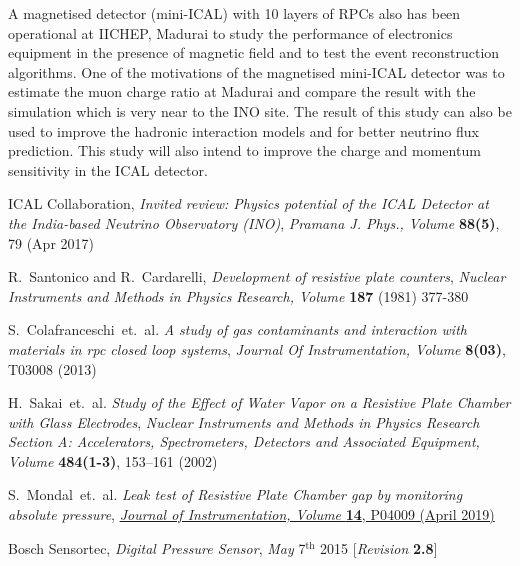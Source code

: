 \documentclass[a4paper,12pt,twoside,openany]{article}
\begin{document}
A magnetised detector (mini-ICAL) with 10 layers of RPCs also has been operational at IICHEP, Madurai to study the performance of electronics equipment in the presence of magnetic field and to test the event reconstruction algorithms. One of the motivations of the magnetised mini-ICAL detector was to estimate the muon charge ratio at Madurai and compare the result with the simulation which is very near to the INO site. The result of this study can also be used to improve the hadronic interaction models and for better neutrino flux prediction. This study will also intend to improve the charge and momentum sensitivity in the ICAL detector.


\begin{thebibliography}{9}

  ICAL Collaboration,  \emph{Invited review: Physics potential of the ICAL Detector at the India-based Neutrino Observatory (INO)}, \emph{Pramana J. Phys., Volume } \textbf{88(5)}, 79 (Apr 2017)
  
  
  R.~Santonico and R.~Cardarelli, \emph{Development of resistive plate counters}, \emph{Nuclear Instruments and Methods in Physics Research, Volume} \textbf{187} (1981) 377-380

  S.~Colafranceschi~et.~al. \emph{A study of gas contaminants and interaction with materials in rpc closed loop systems}, \emph{Journal Of Instrumentation, Volume } \textbf{8(03)}, T03008 (2013)

  H.~Sakai~et.~al. \emph{Study of the Effect of Water Vapor on a Resistive Plate Chamber with Glass Electrodes}, \emph{Nuclear Instruments and Methods in Physics Research Section A: Accelerators, Spectrometers, Detectors and Associated Equipment, Volume } \textbf{484(1-3)}, 153--161 (2002)

  S.~Mondal~et.~al. \emph{Leak test of Resistive Plate Chamber gap by monitoring absolute pressure}, \href{https://doi.org/10.1088/1748-0221/14/04/P04009}{\emph{Journal of Instrumentation, Volume } \textbf{14}, P04009 (April 2019)}

  Bosch Sensortec, \emph{Digital Pressure Sensor}, \emph{May} 7$^\mathrm{th}$ 2015 [\emph{Revision} \textbf{2.8}]


\end{thebibliography}
\end{document}
